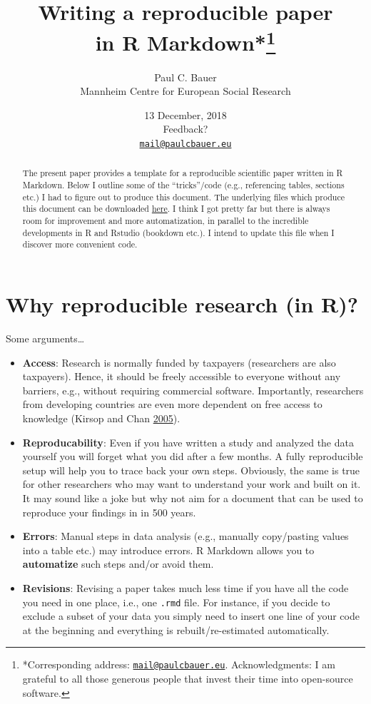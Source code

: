 \documentclass[12pt,]{article}
\title{\vspace{1cm}Writing a reproducible paper\\
in R Markdown*\footnote{*Corresponding address:
  \href{mailto:mail@paulcbauer.eu}{\nolinkurl{mail@paulcbauer.eu}}.
  Acknowledgments: I am grateful to all those generous people that
  invest their time into open-source software.}\vspace{0.5cm}\\}
\author{Paul C. Bauer\\
Mannheim Centre for European Social Research}
\date{13 December, 2018\\[2\baselineskip]Feedback?\\
\href{mailto:mail@paulcbauer.eu}{\nolinkurl{mail@paulcbauer.eu}}\\}
\providecommand{\tightlist}{%
  \setlength{\itemsep}{0pt}\setlength{\parskip}{0pt}}
\theoremstyle{definition}
\theoremstyle{definition}
\theoremstyle{definition}
\theoremstyle{remark}
\begin{document}
\maketitle
\begin{abstract}
\noindent{}The present paper provides a template for a
reproducible scientific paper written in R Markdown. Below I outline
some of the ``tricks''/code (e.g., referencing tables, sections etc.) I
had to figure out to produce this document. The underlying files which
produce this document can be downloaded
\href{https://drive.google.com/drive/folders/1zJP3cNPrHN-gj0rcmbHQgg-XA0hqDXdd?usp=sharing}{here}.
I think I got pretty far but there is always room for improvement and
more automatization, in parallel to the incredible developments in R and
Rstudio (bookdown etc.). I intend to update this file when I discover
more convenient code.\vspace{.8cm}
\end{abstract}

\clearpage

\renewcommand{\baselinestretch}{0.5}

\normalsize
\tableofcontents
\renewcommand{\baselinestretch}{1.1}\normalsize

\clearpage

\section{Why reproducible research (in
R)?}\label{why-reproducible-research-in-r}

Some arguments\ldots{}

\begin{itemize}
\tightlist
\item
  \textbf{Access}: Research is normally funded by taxpayers (researchers
  are also taxpayers). Hence, it should be freely accessible to everyone
  without any barriers, e.g., without requiring commercial software.
  Importantly, researchers from developing countries are even more
  dependent on free access to knowledge (Kirsop and Chan
  \protect\hyperlink{ref-Kirsop2005-ro}{2005}).
\item
  \textbf{Reproducability}: Even if you have written a study and
  analyzed the data yourself you will forget what you did after a few
  months. A fully reproducible setup will help you to trace back your
  own steps. Obviously, the same is true for other researchers who may
  want to understand your work and built on it. It may sound like a joke
  but why not aim for a document that can be used to reproduce your
  findings in in 500 years.
\item
  \textbf{Errors}: Manual steps in data analysis (e.g., manually
  copy/pasting values into a table etc.) may introduce errors. R
  Markdown allows you to \textbf{automatize} such steps and/or avoid
  them.
\item
  \textbf{Revisions}: Revising a paper takes much less time if you have
  all the code you need in one place, i.e., one \texttt{.rmd} file. For
  instance, if you decide to exclude a subset of your data you simply
  need to insert one line of your code at the beginning and everything
  is rebuilt/re-estimated automatically.
\end{itemize}
\end{document}
